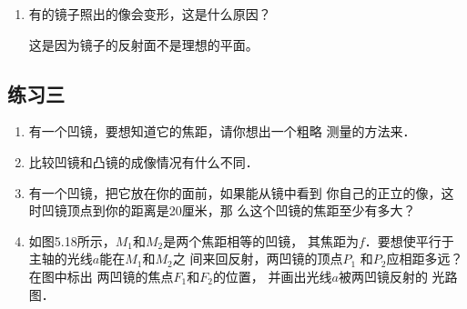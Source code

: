 \begin{enumerate}
    \begin{solution}

    \end{solution}

    \item 有的镜子照出的像会变形，这是什么原因？
    
    \begin{solution}
        这是因为镜子的反射面不是理想的平面。
    \end{solution}
\end{enumerate}






\subsection{练习三}
\begin{enumerate}
    \item 有一个凹镜，要想知道它的焦距，请你想出一个粗略
        测量的方法来．

    \begin{solution}

    \end{solution}
    \item 比较凹镜和凸镜的成像情况有什么不同．

    \begin{solution}

    \end{solution}
    \item 有一个凹镜，把它放在你的面前，如果能从镜中看到
        你自己的正立的像，这时凹镜顶点到你的距离是20厘米，那
        么这个凹镜的焦距至少有多大？

    \begin{solution}

    \end{solution}
    \item 如图5.18所示，$M_1$和$M_2$是两个焦距相等的凹镜，
    其焦距为$f$．要想使平行于主轴的光线$a$能在$M_1$和$M_2$之
    间来回反射，两凹镜的顶点$P_1$
    和$P_2$应相距多远？在图中标出
    两凹镜的焦点$F_1$和$F_2$的位置，
    并画出光线$a$被两凹镜反射的
    光路图．

    \begin{solution}

    \end{solution}
\end{enumerate}

